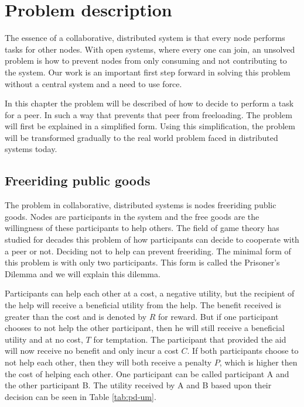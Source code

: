 \chapter{Problem description}
The essence of a collaborative, distributed system is that every node performs tasks for other nodes.
With open systems, where every one can join, an unsolved problem is how to prevent nodes
from only consuming and not contributing to the system.
Our work is an important first step forward in solving this problem without a central system
and a need to use force.

In this chapter the problem will be described of how to decide to perform a task for a peer.
In such a way that prevents that peer from freeloading.
The problem will first be explained in a simplified form.
Using this simplification, the problem will be transformed gradually
to the real world problem faced in distributed systems today.

\section{Freeriding public goods}
The problem in collaborative, distributed systems is nodes freeriding public goods.
Nodes are participants in the system and the free goods are the willingness of these participants to help others.
The field of game theory has studied for decades this problem of how
participants can decide to cooperate with a peer or not\cite{Hardin-Tragedy}.
Deciding not to help can prevent freeriding.
The minimal form of this problem is with only two participants.
This form is called the Prisoner's Dilemma
and we will explain this dilemma\cite{Nowak-PrisonerDilemma}\cite{Lai-Incentives}.

Participants can help each other at a cost, a negative utility,
but the recipient of the help will receive a beneficial utility from the help.
The benefit received is greater than the cost and is denoted by $R$ for reward.
But if one participant chooses to not help the other participant,
then he will still receive a beneficial utility and at no cost, $T$ for temptation.
The participant that provided the aid will now receive no benefit and only incur a cost $C$.
If both participants choose to not help each other,
then they will both receive a penalty $P$, which is higher then the cost of helping each other.
One participant can be called participant A and the other participant B.
The utility received by A and B based upon their decision can be seen in Table \ref{tab:pd-um}.

